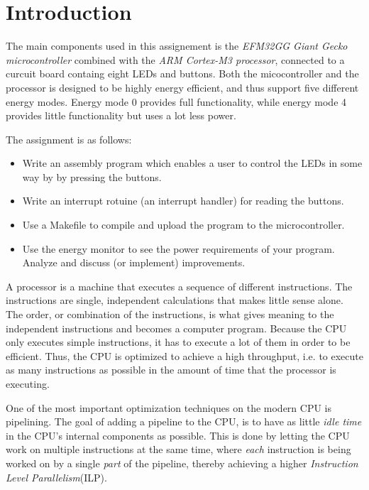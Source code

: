 \section{Introduction}

The main components used in this assignement is the \textit{EFM32GG Giant Gecko microcontroller} combined with
the \textit{ARM Cortex-M3 processor}, connected to a curcuit board containg eight LEDs and buttons. Both the 
micocontroller and the processor is designed to be highly energy efficient, and thus support five different energy modes.
Energy mode 0 provides full functionality, while energy mode 4 provides little functionality but uses a lot less power. 

\linebreak[4]
The assignment is as follows:

\begin{itemize}
    \item   Write an assembly program which enables a user to control the LEDs in some way by
            by pressing the buttons.
    \item   Write an interrupt rotuine (an interrupt handler) for reading the buttons.
    \item   Use a Makefile to compile and upload the program to the microcontroller.
    \item   Use the energy monitor to see the power requirements of your program. Analyze and
            discuss (or implement) improvements. 
    \end{itemize}


A processor is a machine that executes
a sequence of different instructions. The instructions are
single, independent calculations that makes little sense alone.
The order, or combination of the instructions, is what gives meaning to
the independent instructions and becomes a computer program.
Because the CPU only executes simple instructions, 
it has to execute a lot of them in order to be efficient. Thus,
the CPU is optimized to achieve a high throughput, 
i.e. to execute as many instructions as possible in the amount of time
that the processor is executing.

One of the most important optimization techniques on the modern CPU
is pipelining. The goal of adding a pipeline to
the CPU, is to have as little \textit{idle time} in the CPU's internal
components as possible. This is done by letting the CPU work on multiple
instructions at the same time, where \textit{each} instruction is being
worked on by a single \textit{part} of the pipeline, thereby achieving a higher
\textit{Instruction Level Parallelism}(ILP).


